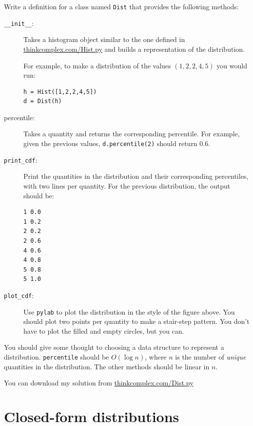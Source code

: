 \documentclass[10pt]{book}
\begin{document}
\begin{ex}
Write a definition for a class named {\tt Dist} that provides the
following methods:

\begin{description}

\item[{\tt\_\_init\_\_}:] Takes a histogram object similar to
the one defined in \url{thinkcomplex.com/Hist.py}
and builds a representation of the distribution.

For example, to make a distribution of the values $(1,2,2,4,5)$
you would run:

\begin{verbatim}
h = Hist([1,2,2,4,5])
d = Dist(h)
\end{verbatim}

\item[percentile:] Takes a quantity and returns the corresponding
percentile.  For example, given the previous values, {\tt d.percentile(2)}
should return $0.6$.

\item[{\tt print\_cdf}:] Print the quantities in the distribution
and their corresponding percentiles, with two lines per
quantity.  For the previous distribution, the output should be:

\begin{verbatim}
1 0.0
1 0.2
2 0.2
2 0.6
4 0.6
4 0.8
5 0.8
5 1.0
\end{verbatim}

\item[{\tt plot\_cdf}:] Use {\tt pylab} to plot the distribution
in the style of the figure above.  You should plot two points
per quantity to make a stair-step pattern.  You don't have to
plot the filled and empty circles, but you can.


\end{description}

You should give some thought to choosing a data structure to
represent a distribution.  {\tt percentile} should be $O(\log n)$,
where $n$ is the
number of {\em unique} quantities in the distribution.
The other methods should be linear in $n$.

You can download my solution from
\url{thinkcomplex.com/Dist.py}

\end{ex}


\section{Closed-form distributions}
\end{document}
